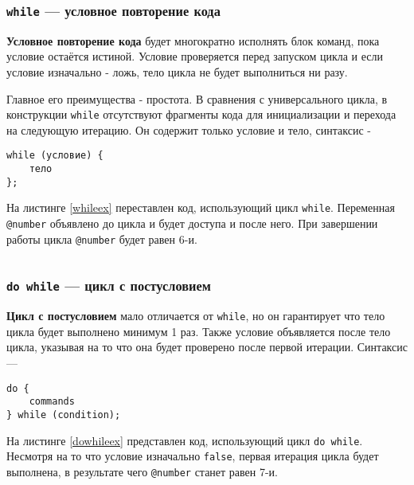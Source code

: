 \begin{sourcecode}
	\label{uniloopex}
    \inputminted[linenos]{icl}{../sources/uniloopex.icL}
\end{sourcecode}

\subsubsection{\texttt{while} — условное повторение кода}

{\bf Условное повторение кода} будет многократно исполнять блок команд, пока условие остаётся истиной. Условие проверяется перед запуском цикла и если условие изначально - ложь, тело цикла не будет выполниться ни разу.

Главное его преимущества - простота. В сравнения с универсального цикла, в конструкции \texttt{while} отсутствуют фрагменты кода для инициализации и перехода на следующую итерацию. Он содержит только условие и тело, синтаксис -
\begin{verbatim}
while (условие) {
	тело
};
\end{verbatim}

На листинге \ref{whileex} переставлен код, использующий цикл \texttt{while}. Переменная \texttt{@number} объявлено до цикла и будет доступа и после него. При завершении работы цикла \texttt{@number} будет равен 6-и.

\begin{sourcecode}
	\label{whileex}
    \inputminted[linenos]{icl}{../sources/whileex.icL}
\end{sourcecode}

\subsubsection{\texttt{do while} — цикл с постусловием}

{\bf Цикл с постусловием} мало отличается от \texttt{while}, но он гарантирует что тело цикла будет выполнено минимум 1 раз. Также условие объявляется после тело цикла, указывая на то что она будет проверено после первой итерации. Синтаксис —
\begin{verbatim}
do {
	commands
} while (condition);
\end{verbatim}

На листинге \ref{dowhileex} представлен код, использующий цикл \texttt{do while}. Несмотря на то что условие изначально \texttt{false}, первая итерация цикла будет выполнена, в результате чего \texttt{@number} станет равен 7-и.

